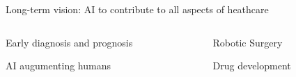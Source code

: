 \documentclass[8pt,xcolor=table]{beamer}
\begin{document}
\begin{frame}{Long-term vision: AI to contribute to all aspects of heathcare}



\begin{columns}[t]
\begin{column}{0.5\textwidth}
\centering


Early diagnosis and prognosis

AI augumenting humans\\




\end{column}
\begin{column}{0.5\textwidth}
\centering


Robotic Surgery

\vo

Drug development


\end{column}
\end{columns}




\end{frame}
\end{document}
